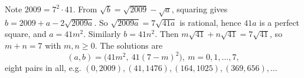 Note $2009=7^2\cdot41$. From $\sqrt b=\sqrt{2009}-\sqrt a$, squaring gives $b=2009+a-2\sqrt{2009a}$. So $\sqrt{2009a}=7\sqrt{41a}$ is rational, hence $41a$ is a perfect square, and $a=41m^2$. Similarly $b=41n^2$. Then $m\sqrt{41}+n\sqrt{41}=7\sqrt{41}$, so $m+n=7$ with $m,n\ge0$. The solutions are
\[\boxed{(a,b)=\bigl(41m^2,\ 41(7-m)^2\bigr),\ m=0,1,\dots,7},\]
eight pairs in all, e.g. $(0,2009),(41,1476),(164,1025),(369,656),\dots$
